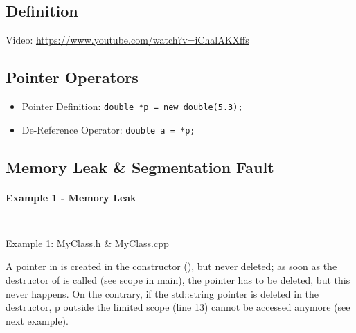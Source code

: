 \subsection{Definition}
Video: \url{https://www.youtube.com/watch?v=iChalAKXffs}
\subsection{Pointer Operators}
\begin{itemize}
	\item Pointer Definition: \texttt{double *p = new double(5.3);}
	\item De-Reference Operator: \texttt{double a = *p;}
\end{itemize}
\subsection{Memory Leak \& Segmentation Fault}

\paragraph{Example 1 - Memory Leak}
	
	\begin{listing}[!htbp]
		\begin{minipage}[t]{0.45\textwidth}
			\inputminted{cpp}{src/pointers/ex-1/MyClass.h}
		\end{minipage}\hfill
		\begin{minipage}[t]{0.45\textwidth}
			\inputminted{cpp}{src/pointers/ex-1/MyClass.cpp}
		\end{minipage}
		\caption{Example 1: MyClass.h \& MyClass.cpp}
	\end{listing}

	A pointer in  is created in the constructor (), but never deleted; as soon as the destructor of  is called (see scope in main), the pointer has to be deleted, but this never happens. On the contrary, if the std::string pointer is deleted in the destructor, p outside the limited scope (line 13) cannot be accessed anymore (see next example).
	
	\inputminted{cpp}{src/pointers/ex-1/main.cpp}
	
